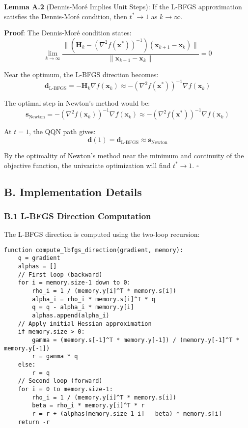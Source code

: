 \textbf{Lemma A.2} (Dennis-Moré Implies Unit Steps): If the L-BFGS approximation satisfies the Dennis-Moré condition, then \(t^* \to 1\) as \(k \to \infty\).

\textbf{Proof}: The Dennis-Moré condition states:
\[\lim_{k \to \infty} \frac{\|(\mathbf{H}_k - (\nabla^2 f(\mathbf{x}^*))^{-1})(\mathbf{x}_{k+1} - \mathbf{x}_k)\|}{\|\mathbf{x}_{k+1} - \mathbf{x}_k\|} = 0\]

Near the optimum, the L-BFGS direction becomes:
\[\mathbf{d}_{\text{L-BFGS}} = -\mathbf{H}_k \nabla f(\mathbf{x}_k) \approx -(\nabla^2 f(\mathbf{x}^*))^{-1} \nabla f(\mathbf{x}_k)\]

The optimal step in Newton's method would be:
\[\mathbf{s}_{\text{Newton}} = -(\nabla^2 f(\mathbf{x}_k))^{-1} \nabla f(\mathbf{x}_k) \approx -(\nabla^2 f(\mathbf{x}^*))^{-1} \nabla f(\mathbf{x}_k)\]

At \(t = 1\), the QQN path gives:
\[\mathbf{d}(1) = \mathbf{d}_{\text{L-BFGS}} \approx \mathbf{s}_{\text{Newton}}\]

By the optimality of Newton's method near the minimum and continuity of the objective function, the univariate optimization will find \(t^* \to 1\). \(\square\)

\hypertarget{b.-implementation-details}{%
\subsection{B. Implementation Details}\label{b.-implementation-details}}

\hypertarget{b.1-l-bfgs-direction-computation}{%
\subsubsection{B.1 L-BFGS Direction Computation}\label{b.1-l-bfgs-direction-computation}}

The L-BFGS direction is computed using the two-loop recursion:

\begin{verbatim}
function compute_lbfgs_direction(gradient, memory):
    q = gradient
    alphas = []
    // First loop (backward)
    for i = memory.size-1 down to 0:
        rho_i = 1 / (memory.y[i]^T * memory.s[i])
        alpha_i = rho_i * memory.s[i]^T * q
        q = q - alpha_i * memory.y[i]
        alphas.append(alpha_i)
    // Apply initial Hessian approximation
    if memory.size > 0:
        gamma = (memory.s[-1]^T * memory.y[-1]) / (memory.y[-1]^T * memory.y[-1])
        r = gamma * q
    else:
        r = q
    // Second loop (forward)
    for i = 0 to memory.size-1:
        rho_i = 1 / (memory.y[i]^T * memory.s[i])
        beta = rho_i * memory.y[i]^T * r
        r = r + (alphas[memory.size-1-i] - beta) * memory.s[i]
    return -r
\end{verbatim}

